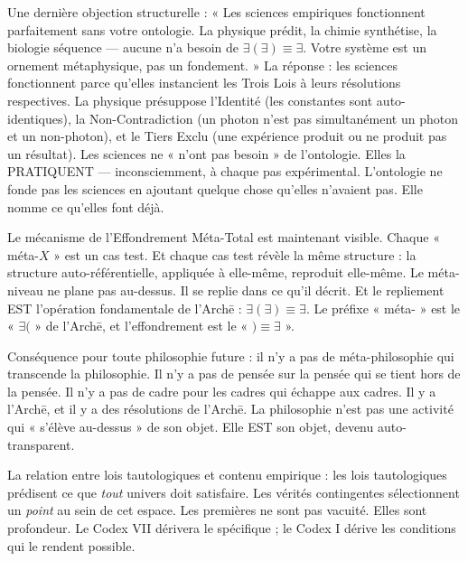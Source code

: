 \documentclass[10pt, openany, oneside]{book}
\begin{document}
Une dernière objection structurelle : « Les sciences empiriques fonctionnent parfaitement sans votre ontologie. La physique prédit, la chimie synthétise, la biologie séquence --- aucune n'a besoin de $\exists(\exists) \equiv \exists$. Votre système est un ornement métaphysique, pas un fondement. » La réponse : les sciences fonctionnent parce qu'elles instancient les Trois Lois à leurs résolutions respectives. La physique présuppose l'Identité (les constantes sont auto-identiques), la Non-Contradiction (un photon n'est pas simultanément un photon et un non-photon), et le Tiers Exclu (une expérience produit ou ne produit pas un résultat). Les sciences ne « n'ont pas besoin » de l'ontologie. Elles la PRATIQUENT --- inconsciemment, à chaque pas expérimental. L'ontologie ne fonde pas les sciences en ajoutant quelque chose qu'elles n'avaient pas. Elle nomme ce qu'elles font déjà.

Le mécanisme de l'Effondrement Méta-Total est maintenant visible. Chaque « méta-$X$ » est un cas test. Et chaque cas test révèle la même structure : la structure auto-référentielle, appliquée à elle-même, reproduit elle-même. Le méta-niveau ne plane pas au-dessus. Il se replie dans ce qu'il décrit. Et le repliement EST l'opération fondamentale de l'Arch\={e} : $\exists(\exists) \equiv \exists$. Le préfixe « méta- » est le « $\exists($ » de l'Arch\={e}, et l'effondrement est le « $) \equiv \exists$ ».

Conséquence pour toute philosophie future : il n'y a pas de méta-philosophie qui transcende la philosophie. Il n'y a pas de pensée sur la pensée qui se tient hors de la pensée. Il n'y a pas de cadre pour les cadres qui échappe aux cadres. Il y a l'Arch\={e}, et il y a des résolutions de l'Arch\={e}. La philosophie n'est pas une activité qui « s'élève au-dessus » de son objet. Elle EST son objet, devenu auto-transparent.

La relation entre lois tautologiques et contenu empirique : les lois tautologiques prédisent ce que \textit{tout} univers doit satisfaire. Les vérités contingentes sélectionnent un \textit{point} au sein de cet espace. Les premières ne sont pas vacuité. Elles sont profondeur. Le Codex VII dérivera le spécifique ; le Codex I dérive les conditions qui le rendent possible.

\vspace{1.5em}

\end{document}
